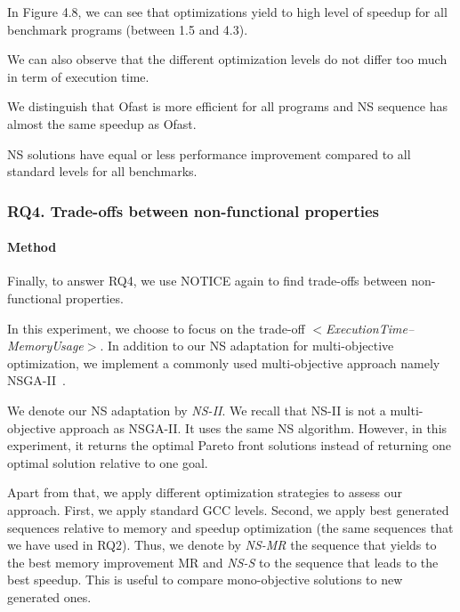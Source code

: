 In Figure 4.8, we can see that optimizations yield to high level of speedup for all benchmark programs (between 1.5 and 4.3).

We can also observe that the different optimization levels do not differ too much in term of execution time. 

We distinguish that Ofast is more efficient for all programs and NS sequence has almost the same speedup as Ofast. 

NS solutions have equal or less performance improvement compared to all standard levels for all benchmarks. 




\noindent{}
	
\subsubsection{RQ4. Trade-offs between non-functional properties}
\paragraph{Method}
Finally, to answer RQ4, we use NOTICE again to find trade-offs between non-functional properties. 

In this experiment, we choose to focus on the trade-off \textit{$<$ExecutionTime--MemoryUsage$>$}. In addition to our NS adaptation for multi-objective optimization, we implement a commonly used multi-objective approach namely NSGA-II~\cite{deb2002fast}. 

We denote our NS adaptation by \textit{NS-II}. We recall that NS-II is not a multi-objective approach as NSGA-II. It uses the same NS algorithm. However, in this experiment, it returns the optimal Pareto front solutions instead of returning one optimal solution relative to one goal. 

Apart from that, we apply different optimization strategies to assess our approach. 	
First, we apply standard GCC levels. Second, we apply best generated sequences relative to memory and speedup optimization (the same sequences that we have used in RQ2). Thus, we denote by \textit{NS-MR} the sequence that yields to the best memory improvement MR and \textit{NS-S} to the sequence that leads to the best speedup. This is useful to compare mono-objective solutions to new generated ones.
	
